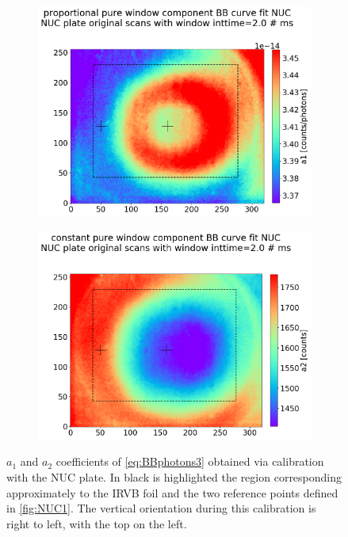 \begin{figure}
     \centering
     \begin{subfigure}{0.6\linewidth}
         \centering
	    \includegraphics[trim={40 0 0 60},clip,width=\linewidth]{Chapters/chapter2/figs/NUC_a12.png}
         \label{NUC_a1}
     \end{subfigure}
     \begin{subfigure}{0.6\linewidth}
         \centering
    	\includegraphics[trim={40 0 0 60},clip,width=\linewidth]{Chapters/chapter2/figs/NUC_a22.png}
         \label{NUC_a2}
     \end{subfigure}
    \caption{$a_1$ and $a_2$ coefficients of \autoref{eq:BBphotons3} obtained via calibration with the NUC plate. In black is highlighted the region corresponding approximately to the IRVB foil and the two reference points defined in \autoref{fig:NUC1}. The vertical orientation during this calibration is right to left, with the top on the left.}
    \label{fig:NUC_a1_a2}
\end{figure}

